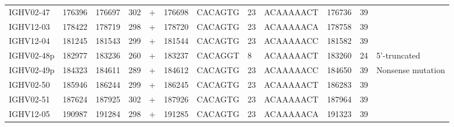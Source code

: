 \begin{tabular}{lrrrlrlllrrl}
  IGHV02-47 & 176396 & 176697 & 302 & + & 176698 & CACAGTG & 23 & ACAAAAACT & 176736 & 39 &  \\ 
  IGHV12-03 & 178422 & 178719 & 298 & + & 178720 & CACAGTG & 23 & ACAAAAACA & 178758 & 39 &  \\ 
  IGHV12-04 & 181245 & 181543 & 299 & + & 181544 & CACAGTG & 23 & ACAAAAACC & 181582 & 39 &  \\ 
  IGHV02-48p & 182977 & 183236 & 260 & + & 183237 & CACAGGT & 8 & ACAAAAACT & 183260 & 24 & 5'-truncated \\ 
  IGHV02-49p & 184323 & 184611 & 289 & + & 184612 & CACAGTG & 23 & ACAAAAACC & 184650 & 39 & Nonsense mutation \\ 
  IGHV02-50 & 185946 & 186244 & 299 & + & 186245 & CACAGTG & 23 & ACAAAAACT & 186283 & 39 &  \\ 
  IGHV02-51 & 187624 & 187925 & 302 & + & 187926 & CACAGTG & 23 & ACAAAAACT & 187964 & 39 &  \\ 
  IGHV12-05 & 190987 & 191284 & 298 & + & 191285 & CACAGTG & 23 & ACAAAAACA & 191323 & 39 &  \\ 
   \bottomrule \end{tabular}
